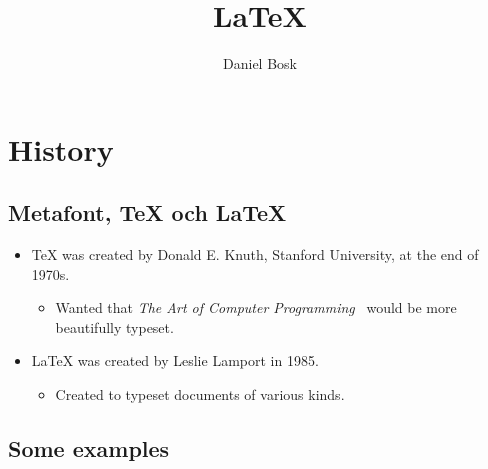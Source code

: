 \title{%
  LaTeX
}
\author{Daniel Bosk}


\mode*

\begin{abstract}
  
\end{abstract}


\section{History}

\subsection{Metafont, \TeX{} och \LaTeX}

\begin{frame}
  \begin{itemize}
    \item \TeX{} was created by Donald E. Knuth, Stanford University, at the 
      end of 1970s.
			\begin{itemize}
        \item Wanted that
          \emph{The Art of Computer Programming}~\cite{Knuth1997tao}
          would be more beautifully typeset.
      \end{itemize}
    \item \LaTeX{} was created by Leslie Lamport in 1985.
			\begin{itemize}
        \item Created to typeset documents of various kinds.
      \end{itemize}
	\end{itemize}
\end{frame}

\subsection{Some examples}

